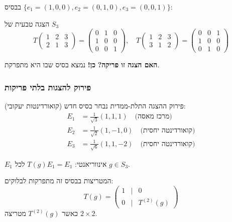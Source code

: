 בבסיס $\{e_1 = (1,0,0), e_2 = (0,1,0), e_3 = (0,0,1)\}$:

\begin{examplebox}[label=ex:S3_natural]{הצגה טבעית של $S_3$}
\[
T\begin{pmatrix} 1 & 2 & 3 \\ 2 & 1 & 3 \end{pmatrix} = 
\begin{pmatrix} 0 & 1 & 0 \\ 1 & 0 & 0 \\ 0 & 0 & 1 \end{pmatrix}, \quad
T\begin{pmatrix} 1 & 2 & 3 \\ 3 & 1 & 2 \end{pmatrix} = 
\begin{pmatrix} 0 & 0 & 1 \\ 1 & 0 & 0 \\ 0 & 1 & 0 \end{pmatrix}
\]
\end{examplebox}

\textbf{האם הצגה זו פריקה?} \textbf{כן!} נמצא בסיס שבו היא מתפרקת.

\subsubsection{פירוק להצגות בלתי פריקות}

\begin{importantbox}[label=box:S3_decomposition]{פירוק ההצגה התלת-ממדית}
נבחר בסיס חדש (קואורדינטות יעקובי):
\begin{align*}
E_1 &= \frac{1}{\sqrt{3}}(1, 1, 1) \quad \text{(מרכז מאסה)} \\
E_2 &= \frac{1}{\sqrt{2}}(1, -1, 0) \quad \text{(קואורדינטה יחסית)} \\
E_3 &= \frac{1}{\sqrt{6}}(1, 1, -2) \quad \text{(קואורדינטה יחסית)}
\end{align*}

$E_1$ אינווריאנטי: $T(g) E_1 = E_1$ לכל $g \in S_3$.

המטריצות בבסיס זה מתפרקות לבלוקים:
\[
T(g) = \begin{pmatrix} 1 & \mid & 0 \\ \hline 0 & \mid & T^{(2)}(g) \end{pmatrix}
\]
כאשר $T^{(2)}(g)$ מטריצה $2 \times 2$.
\end{importantbox}

